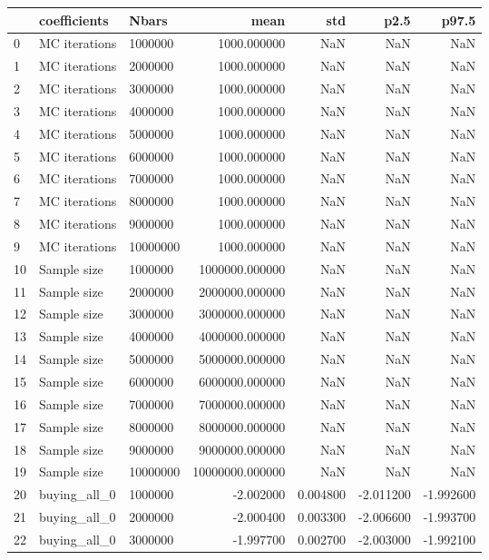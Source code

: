 \begin{tabular}{lllrrrr}
\toprule
 & coefficients & Nbars & mean & std & p2.5 & p97.5 \\
\midrule
0 & MC iterations & 1000000 & 1000.000000 & NaN & NaN & NaN \\
1 & MC iterations & 2000000 & 1000.000000 & NaN & NaN & NaN \\
2 & MC iterations & 3000000 & 1000.000000 & NaN & NaN & NaN \\
3 & MC iterations & 4000000 & 1000.000000 & NaN & NaN & NaN \\
4 & MC iterations & 5000000 & 1000.000000 & NaN & NaN & NaN \\
5 & MC iterations & 6000000 & 1000.000000 & NaN & NaN & NaN \\
6 & MC iterations & 7000000 & 1000.000000 & NaN & NaN & NaN \\
7 & MC iterations & 8000000 & 1000.000000 & NaN & NaN & NaN \\
8 & MC iterations & 9000000 & 1000.000000 & NaN & NaN & NaN \\
9 & MC iterations & 10000000 & 1000.000000 & NaN & NaN & NaN \\
10 & Sample size & 1000000 & 1000000.000000 & NaN & NaN & NaN \\
11 & Sample size & 2000000 & 2000000.000000 & NaN & NaN & NaN \\
12 & Sample size & 3000000 & 3000000.000000 & NaN & NaN & NaN \\
13 & Sample size & 4000000 & 4000000.000000 & NaN & NaN & NaN \\
14 & Sample size & 5000000 & 5000000.000000 & NaN & NaN & NaN \\
15 & Sample size & 6000000 & 6000000.000000 & NaN & NaN & NaN \\
16 & Sample size & 7000000 & 7000000.000000 & NaN & NaN & NaN \\
17 & Sample size & 8000000 & 8000000.000000 & NaN & NaN & NaN \\
18 & Sample size & 9000000 & 9000000.000000 & NaN & NaN & NaN \\
19 & Sample size & 10000000 & 10000000.000000 & NaN & NaN & NaN \\
20 & buying_all_0 & 1000000 & -2.002000 & 0.004800 & -2.011200 & -1.992600 \\
21 & buying_all_0 & 2000000 & -2.000400 & 0.003300 & -2.006600 & -1.993700 \\
22 & buying_all_0 & 3000000 & -1.997700 & 0.002700 & -2.003000 & -1.992100 \\

\end{tabular}
